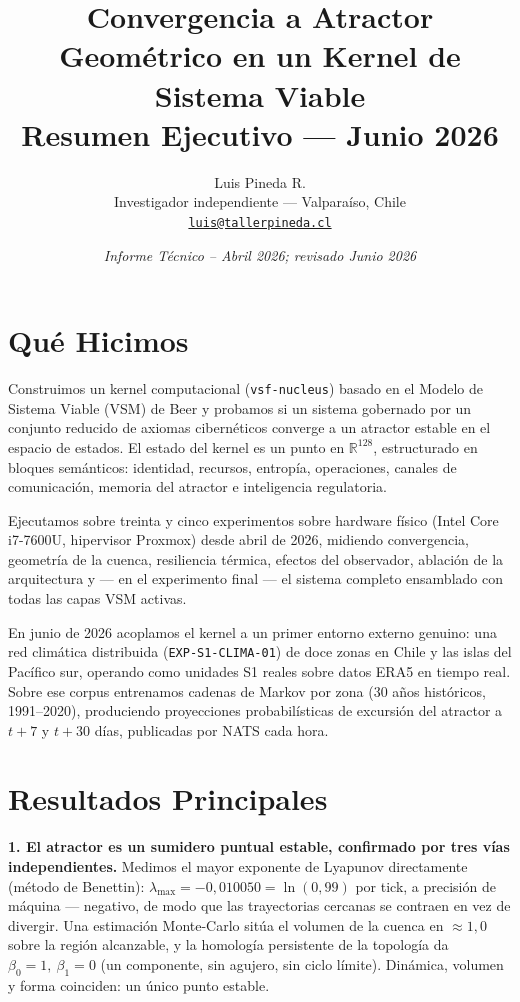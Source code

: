 \documentclass[11pt, a4paper]{article}
\title{%
  \textbf{Convergencia a Atractor Geométrico en un Kernel de Sistema Viable}\\[4pt]
  \large Resumen Ejecutivo — Junio 2026
}
\author{Luis Pineda R.\\
  \small Investigador independiente --- Valparaíso, Chile\\
  \small \href{mailto:luis@tallerpineda.cl}{\texttt{luis@tallerpineda.cl}}}
\date{\textit{Informe Técnico -- Abril 2026; revisado Junio 2026}}
\newcommand{\R}{\mathbb{R}}
\newcommand{\nucleus}{\texttt{vsf-nucleus}}
\begin{document}
\maketitle

\section*{Qué Hicimos}

Construimos un kernel computacional (\nucleus{}) basado en el Modelo de Sistema Viable
(VSM) de Beer y probamos si un sistema gobernado por un conjunto reducido de axiomas
cibernéticos converge a un atractor estable en el espacio de estados. El estado del
kernel es un punto en $\R^{128}$, estructurado en bloques semánticos: identidad,
recursos, entropía, operaciones, canales de comunicación, memoria del atractor e
inteligencia regulatoria.

Ejecutamos sobre treinta y cinco experimentos sobre hardware físico (Intel Core i7-7600U, hipervisor
Proxmox) desde abril de 2026, midiendo convergencia, geometría de la cuenca,
resiliencia térmica, efectos del observador, ablación de la arquitectura y --- en el
experimento final --- el sistema completo ensamblado con todas las capas VSM activas.

En junio de 2026 acoplamos el kernel a un primer entorno externo genuino: una red
climática distribuida (\texttt{EXP-S1-CLIMA-01}) de doce zonas en Chile y las islas
del Pacífico sur, operando como unidades S1 reales sobre datos ERA5 en tiempo real.
Sobre ese corpus entrenamos cadenas de Markov por zona (30 años históricos, 1991--2020),
produciendo proyecciones probabilísticas de excursión del atractor a $t{+}7$ y $t{+}30$
días, publicadas por NATS cada hora.

\section*{Resultados Principales}

\textbf{1. El atractor es un sumidero puntual estable, confirmado por tres vías
independientes.} Medimos el mayor exponente de Lyapunov directamente (método de
Benettin): $\lambda_\text{max} = -0{,}010050 = \ln(0{,}99)$ por tick, a precisión de
máquina --- negativo, de modo que las trayectorias cercanas se contraen en vez de
divergir. Una estimación Monte-Carlo sitúa el volumen de la cuenca en $\approx 1{,}0$
sobre la región alcanzable, y la homología persistente de la topología da
$\beta_0 = 1,\ \beta_1 = 0$ (un componente, sin agujero, sin ciclo límite). Dinámica,
volumen y forma coinciden: un único punto estable.
\end{document}
